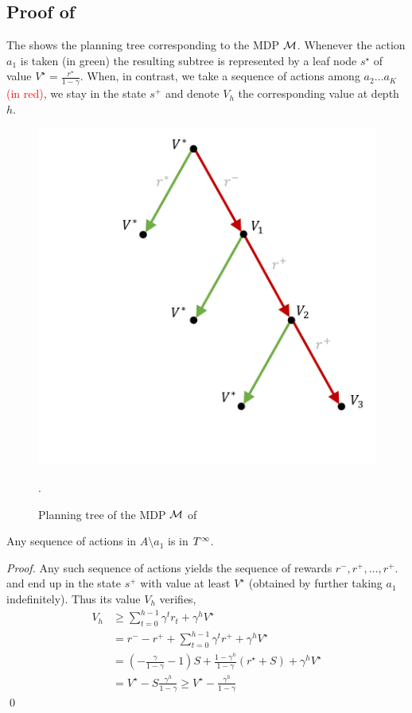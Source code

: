 \documentclass[runningheads]{llncs}
\begin{document}
\subsection{Proof of }

The  shows the planning tree corresponding to the MDP $\mathcal{M}$. Whenever the action $a_1$ is taken \textcolor{OliveGreen}{(in green)} the resulting subtree is represented by a leaf node $s^\star$ of value $V^\star = \frac{r^\star}{1-\gamma}$. When, in contrast, we take a sequence of actions among $a_2\dots a_K$ \textcolor{red}{(in red)}, we stay in the state $s^+$ and denote $V_h$ the corresponding value at depth $h$.

\begin{figure}
    \centering
    \includegraphics[trim={3.5cm 2cm 0.5cm 0.5cm}, clip, width=0.5\linewidth]{img/mdp_tree.pdf}
    \caption{Planning tree of the MDP $\mathcal{M}$ of }.
    \label{fig:mdp-tree}
\end{figure}
\begin{lemma}
 Any sequence of actions in $A\setminus{a_1}$ is in $T^\infty$.
\end{lemma}
\begin{proof}
Any such sequence of actions yields the sequence of rewards $r^-, r^+, \dots,r^+$. and end up in the state $s^+$ with value at least $V^\star$ (obtained by further taking $a_1$ indefinitely). Thus its value $V_h$ verifies, 
\begin{align*}
    V_h &\geq \sum_{t=0}^{h-1} \gamma^t r_t + \gamma^h V^\star\\
    &= r^- - r^+ + \sum_{t=0}^{h-1} \gamma^t r^+ + \gamma^h V^\star \\
    &= (-\frac{\gamma}{1-\gamma} - 1)S + \frac{1-\gamma^h}{1-\gamma} (r^\star + S) + \gamma^h V^\star\\
    &= V^\star - S\frac{\gamma^h}{1-\gamma} \geq V^\star - \frac{\gamma^h}{1-\gamma}
\end{align*}
\qed\end{proof}
\end{document}
